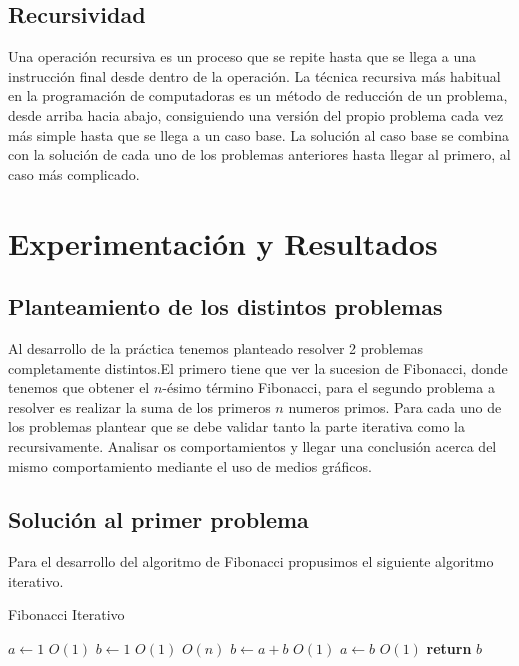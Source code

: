 \documentclass[12pt,twoside]{article}
\begin{document}
\subsection{\textbf{Recursividad}}
\setlength{\parindent}{1.5em}
Una operación recursiva es un proceso que se repite hasta que se llega a una instrucción final desde dentro de la operación. 
La técnica recursiva más habitual en la programación de computadoras es un método de reducción de un problema, desde arriba 
hacia abajo, consiguiendo una versión del propio problema cada vez más simple hasta que se llega a un caso base. La solución 
al caso base se combina con la solución de cada uno de los problemas anteriores hasta llegar al primero, al caso más complicado.

\section{Experimentaci\'on y Resultados}
\subsection{\textbf{Planteamiento de los distintos problemas}}
Al desarrollo de la pr\'actica tenemos planteado resolver 2 problemas completamente distintos.El primero tiene que ver la sucesion
de Fibonacci, donde tenemos que obtener el $n$-\'esimo t\'ermino Fibonacci, para el segundo problema a resolver es realizar la suma de
los primeros $n$ numeros primos. Para cada uno de los problemas plantear que se debe validar tanto la parte iterativa como la 
recursivamente. Analisar os comportamientos y llegar una conclusi\'on acerca del mismo comportamiento mediante el uso de medios
gr\'aficos.
\centerline{}
\subsection{\textbf{Soluci\'on al primer problema}}

Para el desarrollo del algoritmo de Fibonacci propusimos el siguiente algoritmo iterativo.

\begin{algorithm}
  \caption{Fibonacci Iterativo}\label{euclid}
  \begin{algorithmic}[1]
      \State $a\gets 1$ \Comment $O(1)$
      \State $b\gets 1$ \Comment $O(1)$
       \Comment $O(n)$
        \State $b\gets a + b$ \Comment $O(1)$
        \State $a\gets b$ \Comment $O(1)$
      \EndFor\label{euclidendwhile}
      \State \textbf{return} $b$
  \EndFunction
  \end{algorithmic}
\end{algorithm}
\end{document}
